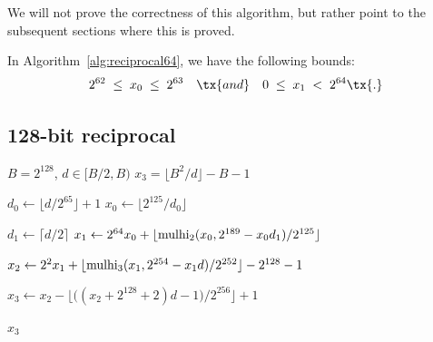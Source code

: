 \documentclass[12pt,oneside,draft]{scrartcl}
\begin{document}
We will not prove the correctness of this algorithm, but rather point to the subsequent sections where this is proved.

\begin{proposition}
\label{proposition:variable64_bounds}
In Algorithm~\ref{alg:reciprocal64}, we have the following bounds:
\begin{gather*}
  2^{62}
\;\le\;
  x_{0}
\;\le\;
  2^{63}
\quad\tx{and}\quad
  0
\;\le\;
  x_{1}
\;<\;
  2^{64}
\tx{.}
\end{gather*}
\end{proposition}

\subsection{128-bit reciprocal}

\begin{algorithm}
\caption{Precomputed reciprocal~$v$ for~$B = 2^{128}$ with 64-bit word size and 63-bit initial estimate.}
\label{alg:reciprocal128}
\begin{algorithmic}[1]
\Require $B = 2^{128}$, $d \in [B / 2, B)$
\Ensure $x_{3} = \lfloor B^{2} / d \rfloor - B - 1$

\State $d_{0} \gets \lfloor d / 2^{65} \rfloor + 1$
\State $x_{0} \gets \lfloor 2^{125} / d_{0} \rfloor$

\State $d_{1} \gets \lceil d / 2 \rceil$
\State $x_{1} \gets 2^{64} x_{0} + \lfloor \operatorname{mulhi}_{2}(x_{0}, 2^{189} - x_{0} d_{1}) / 2^{125} \rfloor$

\State $x_{2} \gets 2^{2} x_{1} + \lfloor \operatorname{mulhi}_{3}(x_{1}, 2^{254} - x_{1} d) / 2^{252} \rfloor - 2^{128} - 1$

\State $x_{3} \gets x_{2} - \bigl\lfloor \bigl( (x_{2} + 2^{128} + 2) d - 1 \bigr) / 2^{256} \bigr\rfloor + 1$

\State \Return $x_{3}$
\end{algorithmic}
\end{algorithm}
\end{document}
